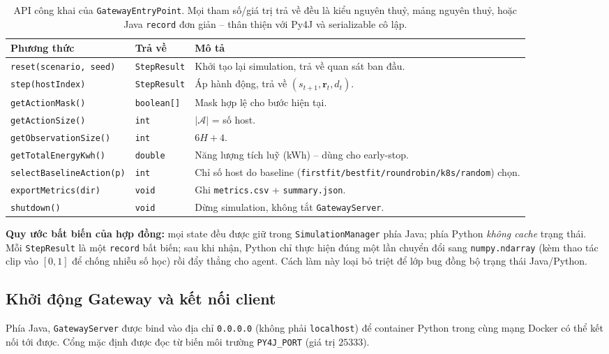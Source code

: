 \begin{table}[H]
  \centering
  \caption{API công khai của \texttt{GatewayEntryPoint}. Mọi tham số/giá
  trị trả về đều là kiểu nguyên thuỷ, mảng nguyên thuỷ, hoặc Java
  \texttt{record} đơn giản -- thân thiện với Py4J và serializable cô lập.}
  \label{tab:gw-api}
  \footnotesize
  \begin{tabularx}{\linewidth}{l l X}
    \toprule
    \textbf{Phương thức} & \textbf{Trả về} & \textbf{Mô tả} \\
    \midrule
    \texttt{reset(scenario, seed)} & \texttt{StepResult} & Khởi tạo lại
        simulation, trả về quan sát ban đầu.\\
    \texttt{step(hostIndex)}        & \texttt{StepResult} & Áp hành động,
        trả về $(s_{t+1}, \mathbf{r}_t, d_t)$.\\
    \texttt{getActionMask()}        & \texttt{boolean[]}  & Mask hợp lệ cho
        bước hiện tại.\\
    \texttt{getActionSize()}        & \texttt{int}        & $|\mathcal{A}|$
        = số host.\\
    \texttt{getObservationSize()}   & \texttt{int}        & $6H + 4$.\\
    \texttt{getTotalEnergyKwh()}    & \texttt{double}     & Năng lượng tích
        luỹ (kWh) -- dùng cho early-stop.\\
    \texttt{selectBaselineAction(p)}& \texttt{int}        & Chỉ số host do
        baseline (\texttt{firstfit/bestfit/roundrobin/k8s/random}) chọn.\\
    \texttt{exportMetrics(dir)}     & \texttt{void}       & Ghi
        \texttt{metrics.csv} + \texttt{summary.json}.\\
    \texttt{shutdown()}             & \texttt{void}       & Dừng simulation,
        không tắt \texttt{GatewayServer}.\\
    \bottomrule
  \end{tabularx}
\end{table}

\textbf{Quy ước bất biến của hợp đồng:} mọi state đều được giữ trong
\texttt{SimulationManager} phía Java; phía Python \emph{không cache}
trạng thái. Mỗi \texttt{StepResult} là một \texttt{record} bất biến;
sau khi nhận, Python chỉ thực hiện đúng một lần chuyển đổi sang
\texttt{numpy.ndarray} (kèm thao tác clip vào $[0,1]$ để chống nhiễu
số học) rồi đẩy thẳng cho agent. Cách làm này loại bỏ triệt để lớp
bug đồng bộ trạng thái Java/Python.

\subsection{Khởi động Gateway và kết nối client}
Phía Java, \texttt{GatewayServer} được bind vào địa chỉ
\texttt{0.0.0.0} (không phải \texttt{localhost}) để container Python
trong cùng mạng Docker có thể kết nối tới được. Cổng mặc định được
đọc từ biến môi trường \texttt{PY4J\_PORT} (giá trị $25333$).

